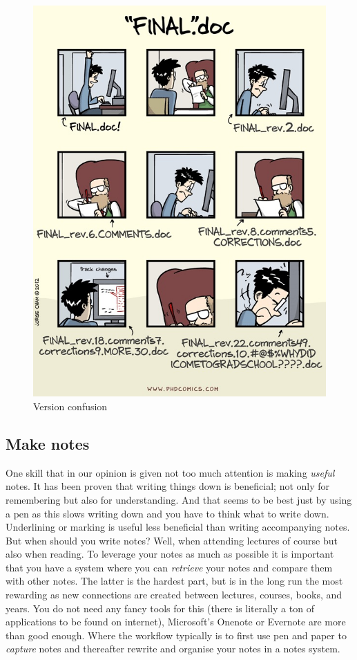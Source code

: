 \documentclass[
]{book}
\begin{document}
\begin{figure}
\centering
\includegraphics{./figures/version.jpeg}
\caption{\label{fig:version}Version confusion}
\end{figure}

\hypertarget{make-notes}{%
\subsection{Make notes}\label{make-notes}}

One skill that in our opinion is given not too much attention is making \emph{useful} notes. It has been proven that writing things down is beneficial; not only for remembering but also for understanding. And that seems to be best just by using a pen as this slows writing down and you have to think what to write down. Underlining or marking is useful less beneficial than writing accompanying notes. But when should you write notes? Well, when attending lectures of course but also when reading. To leverage your notes as much as possible it is important that you have a system where you can \emph{retrieve} your notes and compare them with other notes. The latter is the hardest part, but is in the long run the most rewarding as new connections are created between lectures, courses, books, and years. You do not need any fancy tools for this (there is literally a ton of applications to be found on internet), Microsoft's Onenote or Evernote are more than good enough. Where the workflow typically is to first use pen and paper to \emph{capture} notes and thereafter rewrite and organise your notes in a notes system.
\end{document}
